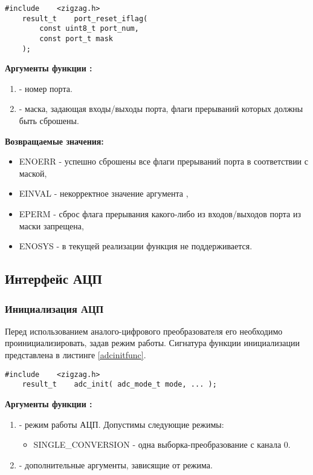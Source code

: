 \begin{lstlisting}[caption=\myarg{port\_reset\_iflag()} - сброс флагов прерывний, label=portresetiflagfunc ]
    #include    <zigzag.h>
    result_t    port_reset_iflag( 
        const uint8_t port_num, 
        const port_t mask 
    );
\end{lstlisting}

{\bfseries Аргументы функции :}

{\itshape
\begin{enumerate}
\item {} - номер порта.
\item {} - маска, задающая входы/выходы порта, флаги прерываний которых должны быть сброшены.
\end{enumerate}
}

{\bfseries Возвращаемые значения:}

{\itshape
\begin{itemize}
\item ENOERR - успешно сброшены все флаги прерываний порта в соответствии с маской,
\item EINVAL - некорректное значение аргумента ,
\item EPERM - сброс флага прерывания какого-либо из входов/выходов порта из маски запрещена,
\item ENOSYS - в текущей реализации функция не поддерживается.
\end{itemize}
}

\subsection{Интерфейс АЦП}
\subsubsection{Инициализация АЦП}
Перед использованием аналого-цифрового преобразователя его необходимо проинициализировать,
задав режим работы. Сигнатура функции инициализации представлена в листинге \ref{adcinitfunc}.

\begin{lstlisting}[caption=\myarg{adc\_init()} - инициализация АЦП, label=adcinitfunc ]
    #include    <zigzag.h>
    result_t    adc_init( adc_mode_t mode, ... );
\end{lstlisting}

{\bfseries Аргументы функции :}
{\itshape
\begin{enumerate}
\item {} - режим работы АЦП. Допустимы следующие режимы:
    \begin{itemize}
        \item SINGLE\_CONVERSION - одна выборка-преобразование с канала 0.
    \end{itemize}
\item {} - дополнительные аргументы, зависящие от режима.
\end{enumerate}
}


